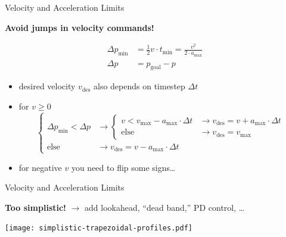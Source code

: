 \documentclass{beamer}
\begin{document}
\begin{frame}{Velocity and Acceleration Limits}
  
  \textbf{Avoid jumps in velocity commands!}
  
  \vfill
  
  \begin{minipage}{0.4\columnwidth}    
    \begin{align*}
      \Delta p_\text{min}
      &=
      \frac{1}{2} v \cdot t_\text{min} = \frac{v^2}{2 \cdot a_\text{max}}
      \\
      \Delta p
      &=
      p_\text{goal} - p
    \end{align*}
  \end{minipage}
  \hfill
  \begin{minipage}{0.4\columnwidth}
    \def\svgwidth{\columnwidth}
    
  \end{minipage}
  
  \vfill
  
  \begin{itemize}
    
  \item
    desired velocity $v_\text{des}$ also depends on timestep $\Delta t$
    
  \item
    for $v \geq 0$
    \[
    \begin{cases}
      \Delta p_\text{min} < \Delta p
      &\rightarrow
      \begin{cases}
        v < v_\text{max} - a_\text{max} \cdot \Delta t
        &\rightarrow
        v_\text{des} = v + a_\text{max} \cdot \Delta t
        \\
        \text{else}
        &\rightarrow
        v_\text{des} = v_\text{max}
      \end{cases}
      \\
      \text{else}
      &\rightarrow
      v_\text{des} = v - a_\text{max} \cdot \Delta t
    \end{cases}
    \]
    
  \item
    for negative $v$ you need to flip some signs\ldots
    
  \end{itemize}
  
\end{frame}


\begin{frame}{Velocity and Acceleration Limits}
  
  \textbf{Too simplistic!} $\rightarrow$ add lookahead, ``dead band,'' PD control, \ldots

  \texttt{[image: simplistic-trapezoidal-profiles.pdf]}
  
\end{frame}
\end{document}
